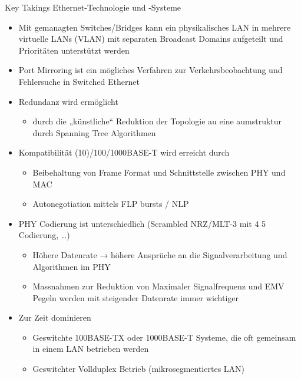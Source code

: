 \begin{KR}{Key Takings Ethernet-Technologie und -Systeme}
    \begin{itemize}
        \item Mit gemanagten Switches/Bridges kann ein physikalisches LAN in mehrere virtuelle LANs (VLAN) mit separaten Broadcast Domains aufgeteilt und Prioritäten unterstützt werden
        \item Port Mirroring ist ein mögliches Verfahren zur Verkehrsbeobachtung und Fehlersuche in Switched Ethernet
        \item Redundanz wird ermöglicht
        \begin{itemize}
            \item durch die „künstliche“ Reduktion der Topologie au eine aumstruktur durch Spanning Tree Algorithmen
        \end{itemize}
        \item Kompatibilität (10)/100/1000BASE-T wird erreicht durch
        \begin{itemize}
            \item Beibehaltung von Frame Format und Schnittstelle zwischen PHY und MAC
            \item Autonegotiation mittels FLP bursts / NLP
        \end{itemize}
        \item PHY Codierung ist unterschiedlich (Scrambled NRZ/MLT-3 mit 4 5 Codierung, …)
        \begin{itemize}
            \item Höhere Datenrate → höhere Ansprüche an die Signalverarbeitung und Algorithmen im PHY
            \item Massnahmen zur Reduktion von Maximaler Signalfrequenz und EMV Pegeln werden mit steigender Datenrate immer wichtiger
        \end{itemize}
        \item Zur Zeit dominieren
        \begin{itemize}
            \item Geswitchte 100BASE-TX oder 1000BASE-T Systeme, die oft gemeinsam in einem LAN betrieben werden
            \item Geswitchter Vollduplex Betrieb (mikrosegmentiertes LAN)
        \end{itemize}
    \end{itemize}
\end{KR}

